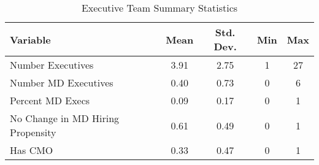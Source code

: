\begin{table}[ht!]
\centering
\caption{\label{leader_sumstats}Executive Team Summary Statistics}
\centering
\begin{tabular}[t]{lcccc}
\toprule
Variable & Mean & Std. Dev. & Min & Max\\
\midrule
Number Executives & 3.91 & 2.75 & 1 & 27\\
Number MD Executives & 0.40 & 0.73 & 0 & 6\\
\hspace{5mm}Percent MD Execs & 0.09 & 0.17 & 0 & 1\\
No Change in MD Hiring Propensity & 0.61 & 0.49 & 0 & 1\\
Has CMO & 0.33 & 0.47 & 0 & 1\\
\bottomrule
\end{tabular}
\end{table}
